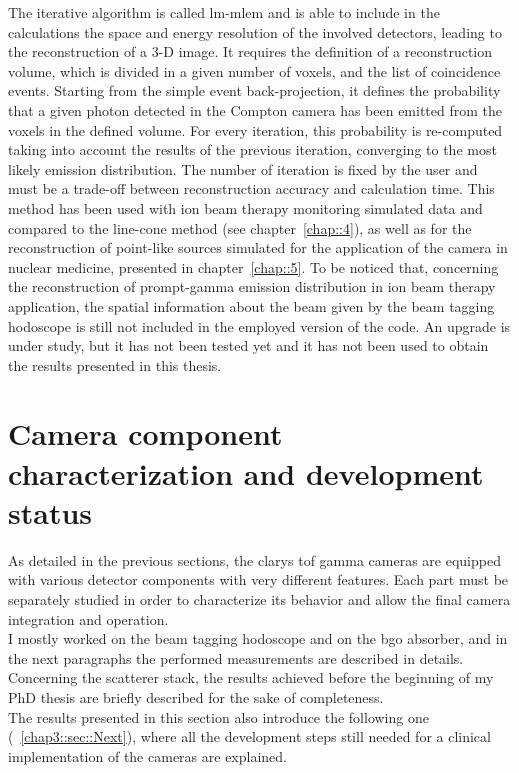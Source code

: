 The iterative algorithm is called \gls{lm-mlem} and is able to include in the calculations the space and energy resolution of the involved detectors, leading to the reconstruction of a 3-D image. It requires the definition of a reconstruction volume, which is divided in a given number of voxels, and the list of coincidence events. Starting from the simple event back-projection, it defines the probability that a given photon detected in the Compton camera has been emitted from the voxels in the defined volume. For every iteration, this probability is re-computed taking into account the results of the previous iteration, converging to the most likely emission distribution. The number of iteration is fixed by the user and must be a trade-off between reconstruction accuracy and calculation time. This method has been used with ion beam therapy monitoring simulated data and compared to the line-cone method (see chapter~\ref{chap::4}), as well as for the reconstruction of point-like sources simulated for the application of the camera in nuclear medicine, presented in chapter~\ref{chap::5}. To be noticed that, concerning the reconstruction of prompt-gamma emission distribution in ion beam therapy application, the spatial information about the beam given by the beam tagging hodoscope is still not included in the employed version of the code. An upgrade is under study, but it has not been tested yet and it has not been used to obtain the results presented in this thesis.   
    

\section{Camera component characterization and development status}\label{chap3::sec::charMeasurements}

As detailed in the previous sections, the \gls{clarys} \gls{tof} gamma cameras are equipped with various detector components with very different features. Each part must be separately studied in order to characterize its behavior and allow the final camera integration and operation.\\
I mostly worked on the beam tagging hodoscope and on the \gls{bgo} absorber, and in the next paragraphs the performed measurements are described in details. Concerning the scatterer stack, the results achieved before the beginning of my PhD thesis are briefly described for the sake of completeness.\\
The results presented in this section also introduce the following one (~\ref{chap3::sec::Next}), where all the development steps still needed for a clinical implementation of the cameras are explained.\\

